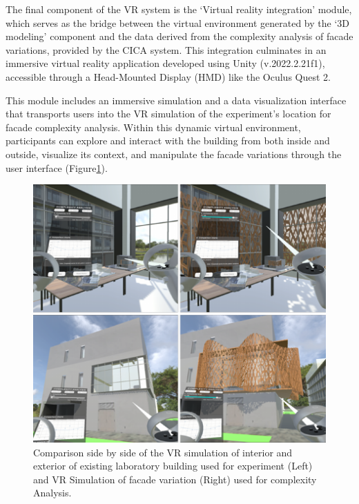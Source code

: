

The final component of the VR system is the `Virtual reality integration' module, which serves as the bridge between the virtual environment generated by the `3D modeling' component and the data derived from the complexity analysis of facade variations, provided by the CICA system.
This integration culminates in an immersive virtual reality application developed using Unity (v.2022.2.21f1), accessible through a Head-Mounted Display (HMD) like the Oculus Quest 2.

This module includes an immersive simulation and a data visualization interface that transports users into the VR simulation of the experiment's location for facade complexity analysis.
Within this dynamic virtual environment, participants can explore and interact with the building from both inside and outside, visualize its context, and manipulate the facade variations through the user interface (Figure\ref{fig:VRInteriorExterior}).

     \begin{figure}[htb]
          \centering
          \includegraphics[width= \linewidth]{Images/VRInteriorExterior}
          \caption{Comparison side by side of the VR simulation of interior and exterior of existing laboratory building used for experiment (Left) and VR Simulation of facade variation (Right) used for complexity Analysis.}
          \label{fig:VRInteriorExterior}
        \end{figure}

